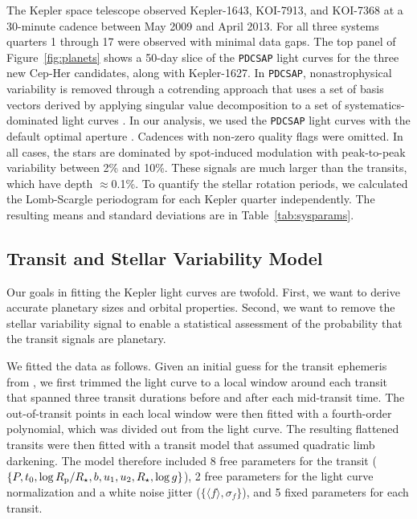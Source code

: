 \documentclass[12pt,twocolumn]{aastex63}
\begin{document}
The Kepler space telescope observed Kepler-1643, KOI-7913, and
KOI-7368 at a 30-minute cadence between May 2009 and April 2013.  For
all three systems quarters 1 through 17 were observed with minimal
data gaps.  The top panel of Figure~\ref{fig:planets} shows a 50-day
slice of the \texttt{PDCSAP} light curves for the three new Cep-Her
candidates, along with Kepler-1627.  In \texttt{PDCSAP},
nonastrophysical variability is removed through a cotrending approach
that uses a set of basis vectors derived by applying singular value
decomposition to a set of systematics-dominated light curves
\citep{smith_kepler_PDC_2017}.  In our analysis, we used the
\texttt{PDCSAP} light curves with the default optimal aperture
\citep{smith_finding_2016}.  Cadences with non-zero quality flags were
omitted.  In all cases, the stars are dominated by spot-induced
modulation with peak-to-peak variability between 2\% and 10\%.  These
signals are much larger than the transits, which have depth
$\approx$0.1\%.  To quantify the stellar rotation periods, we
calculated the Lomb-Scargle periodogram for each Kepler quarter
independently.  The resulting means and standard deviations are in
Table~\ref{tab:sysparams}.


\subsection{Transit and Stellar Variability Model}
\label{sec:fitting}

Our goals in fitting the Kepler light curves are twofold.  First, we
want to derive accurate planetary sizes and orbital properties.
Second, we want to remove the stellar variability signal to enable a
statistical assessment of the probability that the transit signals are
planetary.

We fitted the data as follows.  Given an initial guess for the transit
ephemeris from \citet{thompson_planetary_2018}, we first trimmed the
light curve to a local window around each transit that spanned three
transit durations before and after each mid-transit time.  The
out-of-transit points in each local window were then fitted with a
fourth-order polynomial, which was divided out from the light
curve.  The resulting flattened transits were then fitted with a
transit model that assumed quadratic limb darkening.
The model therefore included 8 free parameters for the transit ($\{P,
t_0, \log R_{\rm p}/R_\star, b, u_1 ,u_2, R_\star, \log g\}$), 2 free
parameters for the light curve normalization and a white noise jitter
($\{\langle f \rangle, \sigma_f \}$), and 5 fixed
parameters for each transit.
\end{document}

